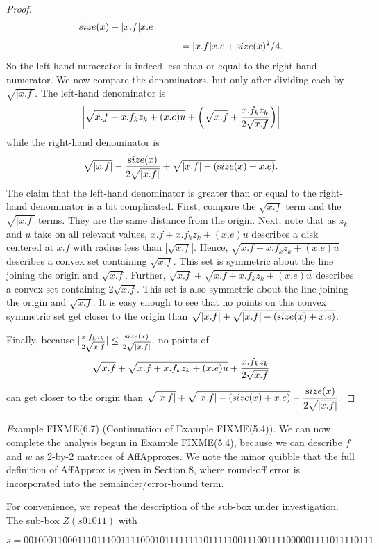 \begin{proof}{}
\begin{eqnarray*}
{size}(x) + |x.f| x.e\\[4pt]
&&\qquad = |x.f| x.e + {\textrm size}(x)^2/4.
\end{eqnarray*}
So the left-hand numerator is indeed less than or equal to the right-hand numerator.
We now compare the denominators, but only after dividing each by
$\sqrt {|x.f|}$. 
The left-hand denominator is
$$\left|\sqrt {x.f + x.f_k z_k + (x.e) u} + 
\left(\sqrt {x.f} + {x.f_k z_k\over 2 \sqrt{x.f}}\right)\right|$$
while the right-hand denominator is 
$$\sqrt{|x.f|} - {{\textrm size}(x) \over 2 \sqrt {|x.f|}} + \sqrt {|x.f| - ({\textrm size}(x) + x.e)}.$$
The claim that the left-hand denominator is greater than or equal to the right-hand denominator is a bit complicated.  First, compare the $\sqrt{x.f}$ term and the $\sqrt{|x.f|}$ terms.  They are the same distance from the origin.  Next, note that as $z_k$ and $u$ take on all
relevant values, $x.f + x.f_k z_k + (x.e) u$ describes a disk centered at $x.f$
with radius   less than $ |\sqrt {x.f}|$.  Hence, $\sqrt {x.f + x.f_k z_k + (x.e) u}$ describes a convex set containing $\sqrt{x.f}$.  This set
is symmetric about the line joining the origin and $\sqrt{x.f}$. Further, $\sqrt{x.f} + \sqrt {x.f + x.f_k z_k + (x.e) u}$ describes a convex
set containing $2 \sqrt{x.f}$.   This set is also symmetric about the line joining the origin and  $\sqrt{x.f}$.
It is easy enough to see that no points on this convex symmetric set get closer to the origin than $\sqrt{|x.f|}  + \sqrt {|x.f| - ({\textrm size}(x) + x.e)}$.

Finally, because $|{x.f_k z_k \over 2 \sqrt{x.f}}| \le {{\textrm size}(x) \over 2 \sqrt {|x.f|}},$ no points of $$\sqrt {x.f} + \sqrt {x.f + x.f_k z_k + (x.e) u} + 
{x.f_k z_k \over 2 \sqrt{x.f}}$$
can get closer to the origin than
\hfill ${\displaystyle \sqrt{|x.f|} + \sqrt {|x.f| - ({\textrm size}(x) + x.e)} - 
{{\textrm size}(x) \over 2 \sqrt {|x.f|}}.} $ \end{proof}

{\textit Example} FIXME(6.7) (Continuation of Example FIXME(5.4)).
We can now complete the analysis begun in Example FIXME(5.4),
because we can describe $f$ and $w$ as 2-by-2 matrices of AffApproxes.
We note the minor quibble that the full definition of AffApprox is
given in Section 8, where round-off error is incorporated into
the remainder/error-bound term.

For convenience,
we repeat the description of the sub-box under investigation.
The sub-box $Z(s01011)$ with  
\begin{small}
$$s = 001000110001110111001111000101111111101111100111001111000001111011110111$$ 
\end{small}%

